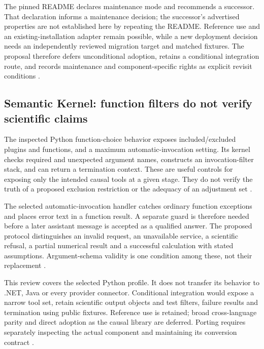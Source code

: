The pinned README declares maintenance mode and recommends a successor.
That declaration informs a maintenance decision; the successor's advertised
properties are not established here by repeating the README. Reference
use and an existing-installation adapter remain possible, while a new
deployment decision needs an independently reviewed migration target and
matched fixtures. The proposal therefore defers unconditional adoption,
retains a conditional integration route, and records maintenance and
component-specific rights as explicit revisit conditions
\cite{v12_la04_autogen,exec24_framework_contracts}.

\subsection{Semantic Kernel: function filters do not verify scientific claims}
The inspected Python function-choice behavior exposes included/excluded
plugins and functions, and a maximum automatic-invocation setting. Its
kernel checks required and unexpected argument names, constructs an
invocation-filter stack, and can return a termination context. These are
useful controls for exposing only the intended causal tools at a given
stage. They do not verify the truth of a proposed exclusion restriction
or the adequacy of an adjustment set
\cite{exec24_framework_semantic_kernel}.

The selected automatic-invocation handler catches ordinary function
exceptions and places error text in a function result. A separate guard
is therefore needed before a later assistant message is accepted as a
qualified answer. The proposed protocol distinguishes an invalid request,
an unavailable service, a scientific refusal, a partial numerical result
and a successful calculation with stated assumptions. Argument-schema
validity is one condition among these, not their replacement
\cite{exec24_framework_semantic_kernel,exec24_framework_contracts}.

This review covers the selected Python profile. It does not transfer its
behavior to .NET, Java or every provider connector. Conditional integration
would expose a narrow tool set, retain scientific output objects and
test filters, failure results and termination using public fixtures.
Reference use is retained; broad cross-language parity and direct adoption
as the causal library are deferred. Porting requires separately inspecting
the actual component and maintaining its conversion contract
\cite{exec24_framework_contracts}.

